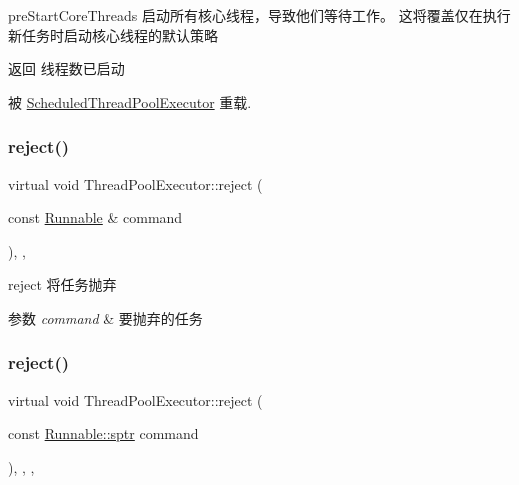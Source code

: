 pre\+Start\+Core\+Threads 启动所有核心线程，导致他们等待工作。 这将覆盖仅在执行新任务时启动核心线程的默认策略 

\begin{DoxyReturn}{返回}
线程数已启动 
\end{DoxyReturn}


被 \hyperlink{classScheduledThreadPoolExecutor_aed48379bdc243fd07e593205ca28f48d}{Scheduled\+Thread\+Pool\+Executor} 重载.

\mbox{\label{classThreadPoolExecutor_a14c4e3d786dcf22e858b11a95d2f77ef}} 
\subsubsection{\texorpdfstring{reject()}{reject()}\hspace{0.1cm}{\footnotesize\ttfamily [1/2]}}
{\footnotesize\ttfamily virtual void Thread\+Pool\+Executor\+::reject (\begin{DoxyParamCaption}\item[{const \hyperlink{classRunnable}{Runnable} \&}]{command }\end{DoxyParamCaption})\hspace{0.3cm}{\ttfamily [inline]}, {\ttfamily [final]}, {\ttfamily [virtual]}}



reject 将任务抛弃 


\begin{DoxyParams}{参数}
{\em command} & 要抛弃的任务 \\
\hline
\end{DoxyParams}
\mbox{\label{classThreadPoolExecutor_a353e65b77bb3c0950ed79939473d4852}} 
\subsubsection{\texorpdfstring{reject()}{reject()}\hspace{0.1cm}{\footnotesize\ttfamily [2/2]}}
{\footnotesize\ttfamily virtual void Thread\+Pool\+Executor\+::reject (\begin{DoxyParamCaption}\item[{const \hyperlink{classRunnable_abe8d3066c7305401d6f0aad8e70780f2}{Runnable\+::sptr}}]{command }\end{DoxyParamCaption})\hspace{0.3cm}{\ttfamily [inline]}, {\ttfamily [final]}, {\ttfamily [protected]}, {\ttfamily [virtual]}}



